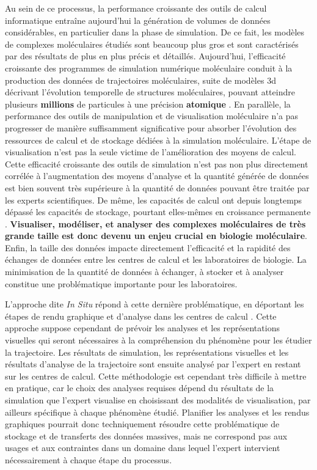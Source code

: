Au sein de ce processus, la performance croissante des outils de calcul informatique entraîne aujourd'hui la génération de volumes de données considérables, en particulier dans la phase de simulation. De ce fait, les modèles de complexes moléculaires étudiés sont beaucoup plus gros et sont caractérisés par des résultats de plus en plus précis et détaillés. Aujourd'hui, l'efficacité croissante des programmes de simulation numérique moléculaire conduit à la production des données de trajectoires moléculaires, suite de modèles 3d décrivant l'évolution temporelle de structures moléculaires, pouvant atteindre plusieurs \textbf{millions} de particules à une précision \textbf{atomique} \cite{sanbonmatsu2013molecular}. En parallèle, la performance des outils de manipulation et de visualisation moléculaire n'a pas progresser de manière suffisamment significative pour absorber l'évolution des ressources de calcul et de stockage dédiées à la simulation moléculaire. L'étape de visualisation n'est pas la seule victime de l'amélioration des moyens de calcul. Cette efficacité croissante des outils de simulation n'est pas non plus directement corrélée à l'augmentation des moyens d'analyse et la quantité générée de données est bien souvent très supérieure à la quantité de données pouvant être traitée par les experts scientifiques. De même, les capacités de calcul ont depuis longtemps dépassé les capacités de stockage, pourtant elles-mêmes en croissance permanente \cite{zimmerman2014data}. \textbf{Visualiser, modéliser, et analyser des complexes moléculaires de très grande taille est donc devenu un enjeu crucial en biologie moléculaire}. Enfin, la taille des données impacte directement l'efficacité et la rapidité des échanges de données entre les centres de calcul et les laboratoires de biologie. La minimisation de la quantité de données à échanger, à stocker et à analyser constitue une problématique importante pour les laboratoires.

L'approche dite \textit{In Situ} répond à cette dernière problématique, en déportant les étapes de rendu graphique et d'analyse dans les centres de calcul \cite{kuhlen2011parallel,ma2009situ}. Cette approche suppose cependant de prévoir les analyses et les représentations visuelles qui seront nécessaires à la compréhension du phénomène pour les étudier la trajectoire. Les résultats de simulation, les représentations visuelles et les résultats d'analyse de la trajectoire sont ensuite analysé par l'expert en restant sur les centres de calcul. Cette méthodologie est cependant très difficile à mettre en pratique, car le choix des analyses requises dépend du résultats de la simulation que l'expert visualise en choisissant des modalités de visualisation, par ailleurs spécifique à chaque phénomène étudié. Planifier les analyses et les rendus graphiques pourrait donc techniquement résoudre cette problématique de stockage et de transferts des données massives, mais ne correspond pas aux usages et aux contraintes dans un domaine dans lequel l'expert intervient nécessairement à chaque étape du processus.

